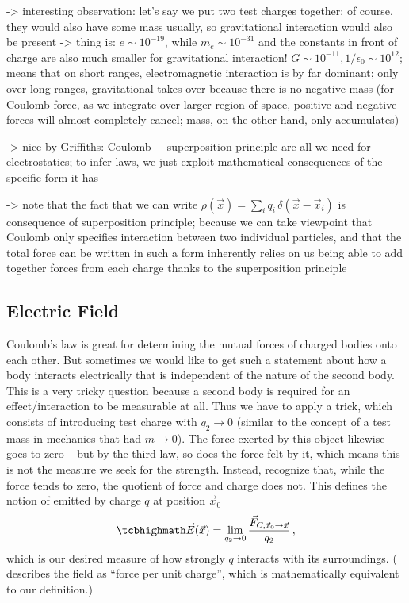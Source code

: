 \documentclass[../class_mech_main.tex]{subfiles}
\begin{document}
-> interesting observation: let's say we put two test charges together; of course, they would also have some mass usually, so gravitational interaction would also be present -> thing is: $e \sim 10^{-19}$, while $m_e \sim 10^{-31}$ and the constants in front of charge are also much smaller for gravitational interaction! $G \sim 10^{-11}, 1/\epsilon_0 \sim 10^{12}$; means that on short ranges, electromagnetic interaction is by far dominant; only over long ranges, gravitational takes over because there is no negative mass (for Coulomb force, as we integrate over larger region of space, positive and negative forces will almost completely cancel; mass, on the other hand, only accumulates)


-> nice by Griffiths: Coulomb + superposition principle are all we need for electrostatics; to infer laws, we just exploit mathematical consequences of the specific form it has


-> note that the fact that we can write $\rho(\vec{x}) = \sum_i q_i \, \delta(\vec{x} - \vec{x}_i)$ is consequence of superposition principle; because we can take viewpoint that Coulomb only specifies interaction between two individual particles, and that the total force can be written in such a form inherently relies on us being able to add together forces from each charge thanks to the superposition principle



        \subsection{Electric Field}
Coulomb's law is great for determining the mutual forces of charged bodies onto each other. But sometimes we would like to get such a statement about how a body interacts electrically that is independent of the nature of the second body. This is a very tricky question because a second body is required for an effect/interaction to be measurable at all. Thus we have to apply a trick, which consists of introducing test charge with $q_2 \rightarrow 0$ (similar to the concept of a test mass in mechanics that had $m \rightarrow 0$). The force exerted by this object likewise goes to zero -- but by the third law, so does the force felt by it, which means this is not the measure we seek for the strength. Instead, recognize that, while the force tends to zero, the quotient of force and charge does not. This defines the notion of  emitted by charge $q$ at position $\vec{x}_0$
\begin{equation}
    \eqbox{
        \vec{E}(\vec{x})
        = \lim_{q_2 \rightarrow 0} \frac{\vec{F}_{C, \vec{x}_0 \rightarrow \vec{x}}}{q_2}
    } \, ,
\end{equation}
which is our desired measure of how strongly $q$ interacts with its surroundings. (\cite{Griffiths_2017} describes the field as \enquote{force per unit charge}, which is mathematically equivalent to our definition.)
\end{document}
